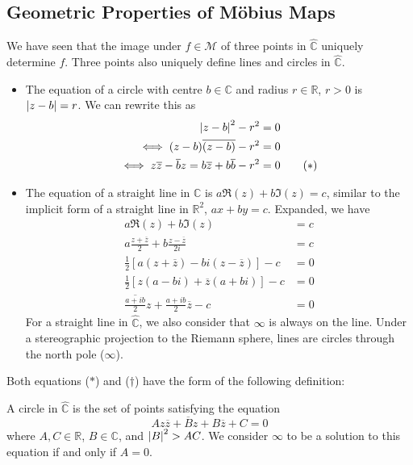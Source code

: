 \subsection{Geometric Properties of M\"obius Maps}
We have seen that the image under \(f \in \mathcal M\) of three points in \(\hat{\mathbb C}\) uniquely determine \(f\).
Three points also uniquely define lines and circles in \(\hat{\mathbb C}\).
\begin{itemize}
	\item The equation of a circle with centre \(b \in \mathbb C\) and radius \(r \in \mathbb R\), \(r > 0\) is \(\abs{z-b} = r\).
	      We can rewrite this as
	      \begin{align*}
		      \abs{z-b}^2 - r^2                                                        & = 0                \\
		      \iff (z-b)\overline{(z-b)} - r^2                                         & = 0                \\
		      \iff z\overline{z} - \overline{b}z = b\overline{z} + b\overline{b} - r^2 & = 0 \tag{\(\ast\)}
	      \end{align*}
	\item The equation of a straight line in \(\mathbb C\) is \(a \Re(z) + b \Im(z) = c\), similar to the implicit form of a straight line in \(\mathbb R^2\), \(ax+by=c\).
	      Expanded, we have
	      \begin{align*}
		      a \Re(z) + b \Im(z)                                                      & = c                   \\
		      a \frac{z + \overline z}{2} + b \frac{z - \overline z}{2i}               & = c                   \\
		      \frac{1}{2}\left[ a (z + \overline z) - bi (z - \overline z) \right] - c & = 0                   \\
		      \frac{1}{2}\left[ z(a-bi) + \overline z(a+bi) \right] - c                & = 0                   \\
		      \overline{\frac{a + ib}{2}}z + \frac{a+ib}{2}\overline{z} - c            & = 0 \tag{\(\dagger\)}
	      \end{align*}
	      For a straight line in \(\hat{\mathbb C}\), we also consider that \(\infty\) is always on the line.
	      Under a stereographic projection to the Riemann sphere, lines are circles through the north pole (\(\infty\)).
\end{itemize}
Both equations (\(\ast\)) and (\(\dagger\)) have the form of the following definition:
\begin{definition}
	A circle in \(\hat{\mathbb C}\) is the set of points satisfying the equation
	\[
		Az\overline z + \overline B z + B \overline z + C = 0
	\]
	where \(A, C \in \mathbb R\), \(B \in \mathbb C\), and \(\abs{B}^2 > AC\).
	We consider \(\infty\) to be a solution to this equation if and only if \(A = 0\).
\end{definition}
